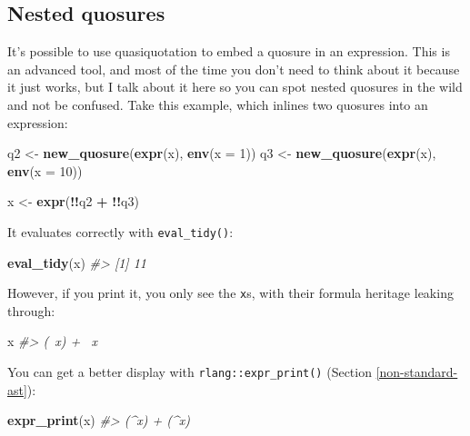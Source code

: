 \documentclass[]{book}
\newenvironment{Shaded}{\begin{snugshade}}{\end{snugshade}}
\newcommand{\CommentTok}[1]{\textcolor[rgb]{0.37,0.37,0.37}{\textit{#1}}}
\newcommand{\DataTypeTok}[1]{\textcolor[rgb]{0.27,0.27,0.27}{#1}}
\newcommand{\DecValTok}[1]{\textcolor[rgb]{0.06,0.06,0.06}{#1}}
\newcommand{\KeywordTok}[1]{\textcolor[rgb]{0.27,0.27,0.27}{\textbf{#1}}}
\newcommand{\NormalTok}[1]{#1}
\newcommand{\OperatorTok}[1]{\textcolor[rgb]{0.43,0.43,0.43}{\textbf{#1}}}
\newcommand{\StringTok}[1]{\textcolor[rgb]{0.5,0.5,0.5}{#1}}
\begin{document}
\hypertarget{nested-quosures}{%
\subsection{Nested quosures}\label{nested-quosures}}


It's possible to use quasiquotation to embed a quosure in an expression. This is an advanced tool, and most of the time you don't need to think about it because it just works, but I talk about it here so you can spot nested quosures in the wild and not be confused. Take this example, which inlines two quosures into an expression:

\begin{Shaded}
\begin{Highlighting}[]
\NormalTok{q2 <-}\StringTok{ }\KeywordTok{new_quosure}\NormalTok{(}\KeywordTok{expr}\NormalTok{(x), }\KeywordTok{env}\NormalTok{(}\DataTypeTok{x =} \DecValTok{1}\NormalTok{))}
\NormalTok{q3 <-}\StringTok{ }\KeywordTok{new_quosure}\NormalTok{(}\KeywordTok{expr}\NormalTok{(x), }\KeywordTok{env}\NormalTok{(}\DataTypeTok{x =} \DecValTok{10}\NormalTok{))}

\NormalTok{x <-}\StringTok{ }\KeywordTok{expr}\NormalTok{(}\OperatorTok{!!}\NormalTok{q2 }\OperatorTok{+}\StringTok{ }\OperatorTok{!!}\NormalTok{q3)}
\end{Highlighting}
\end{Shaded}

It evaluates correctly with \texttt{eval\_tidy()}:

\begin{Shaded}
\begin{Highlighting}[]
\KeywordTok{eval_tidy}\NormalTok{(x)}
\CommentTok{#> [1] 11}
\end{Highlighting}
\end{Shaded}

However, if you print it, you only see the \texttt{x}s, with their formula heritage leaking through:

\begin{Shaded}
\begin{Highlighting}[]
\NormalTok{x}
\CommentTok{#> (~x) + ~x}
\end{Highlighting}
\end{Shaded}

You can get a better display with \texttt{rlang::expr\_print()} (Section \ref{non-standard-ast}):

\begin{Shaded}
\begin{Highlighting}[]
\KeywordTok{expr_print}\NormalTok{(x)}
\CommentTok{#> (^x) + (^x)}
\end{Highlighting}
\end{Shaded}
\end{document}
